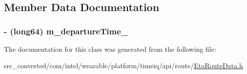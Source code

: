 \subsection{Member Data Documentation}
\hypertarget{interface_eta_route_data_a0eefbe7a36d34f4dfd46c92d23be4334}{}
\subsubsection[{m\+\_\+departure\+Time\+\_\+}]{\setlength{\rightskip}{0pt plus 5cm}-\/ (long64) m\+\_\+departure\+Time\+\_\+}\label{interface_eta_route_data_a0eefbe7a36d34f4dfd46c92d23be4334}


The documentation for this class was generated from the following file\+:\begin{DoxyCompactItemize}
\item 
src\+\_\+converted/com/intel/wearable/platform/timeiq/api/route/\hyperlink{_eta_route_data_8h}{Eta\+Route\+Data.\+h}\end{DoxyCompactItemize}
